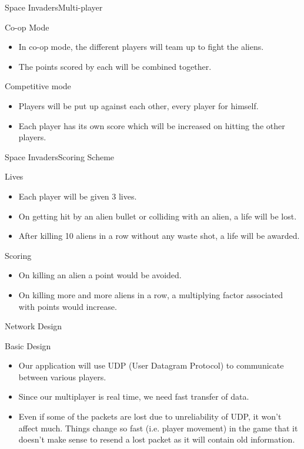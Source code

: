 \documentclass{beamer}
\begin{document}
\begin{frame}{Space Invaders}{Multi-player}
	\begin{block}{Co-op Mode}
	\begin{itemize}
		\item In co-op mode, the different players will team up to fight the aliens.
		\item The points scored by each will be combined together.
	\end{itemize}
	\end{block}
	\begin{block}{Competitive mode}
	\begin{itemize}
		\item Players will be put up against each other, every player for himself. 
		\item Each player has its own score which will be increased on hitting the other players.
	\end{itemize}  
	\end{block}
\end{frame}

\begin{frame}{Space Invaders}{Scoring Scheme}
	\begin{block}{Lives}
		\begin{itemize}
			\item Each player will be given 3 lives.
			\item On getting hit by an alien bullet or colliding with an alien, a life will be lost.
			\item After killing 10 aliens in a row without any waste shot, a life will be awarded.
		\end{itemize}
	\end{block}
	
	\begin{block}{Scoring}
		\begin{itemize}
			\item On killing an alien a point would be avoided.
			\item On killing more and more aliens in a row, a multiplying factor associated with points would increase.
		\end{itemize}
	\end{block}
\end{frame}


\begin{frame}{Network Design}{}
	\begin{block}{Basic Design}
		\begin{itemize}
			\item Our application will use UDP (User Datagram Protocol) to communicate between various players.
			\item Since our multiplayer is real time, we need fast transfer of data.
			\item Even if some of the packets are lost due to unreliability of UDP, it won't affect much. Things change so fast (i.e. player movement) in the game that it doesn't make sense to resend a lost packet as it will contain old information.
		\end{itemize}
	\end{block}
\end{frame}
\end{document}
